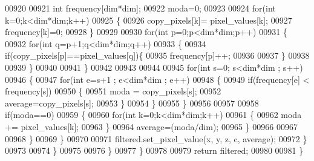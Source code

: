\begin{DoxyCode}
00920         
00921                             \textcolor{keywordtype}{int} frequency[dim*dim];
00922                             moda=0; 
00923                             
00924                             \textcolor{keywordflow}{for}(\textcolor{keywordtype}{int} k=0;k<dim*dim;k++)
00925                             \{
00926                                 copy\_pixels[k]= pixel\_values[k];
00927                                 frequency[k]=0;
00928                             \}
00929                             
00930                             \textcolor{keywordflow}{for}(\textcolor{keywordtype}{int} p=0;p<dim*dim;p++)
00931                             \{
00932                                 \textcolor{keywordflow}{for}(\textcolor{keywordtype}{int} q=p+1;q<dim*dim;q++)
00933                                 \{
00934                                     \textcolor{keywordflow}{if}(copy\_pixels[p]==pixel\_values[q])\{
00935                                         frequency[p]++;
00936                                 
00937                                     \}
00938             
00939                                 \}
00940     
00941                             \}
00942 
00943 
00944 
00945                             \textcolor{keywordflow}{for}(\textcolor{keywordtype}{int} s=0; s<dim*dim ; s++)
00946                             \{
00947                                 \textcolor{keywordflow}{for}(\textcolor{keywordtype}{int} e=s+1 ; e<dim*dim ; e++)
00948                                 \{
00949                                     \textcolor{keywordflow}{if}(frequency[e] < frequency[s])
00950                                     \{
00951                                         moda = copy\_pixels[s];
00952                                         average=copy\_pixels[s];
00953                                     \}
00954                                 \}
00955                             \}
00956                             
00957 
00958                             \textcolor{keywordflow}{if}(moda==0)
00959                             \{
00960                                 \textcolor{keywordflow}{for}(\textcolor{keywordtype}{int} k=0;k<dim*dim;k++)
00961                                 \{
00962                                     moda += pixel\_values[k];
00963                                 \}
00964                             average=(moda/dim);
00965                             \}
00966 
00967 
00968                         \}   
00969                     \}
00970                     
00971                     filtered.set\_pixel\_value(x, y, z, c, average);
00972                 \}
00973                 
00974              \}
00975              
00976          \}
00977     \}
00978 
00979 \textcolor{keywordflow}{return} filtered;
00980 
00981 \}
\end{DoxyCode}

